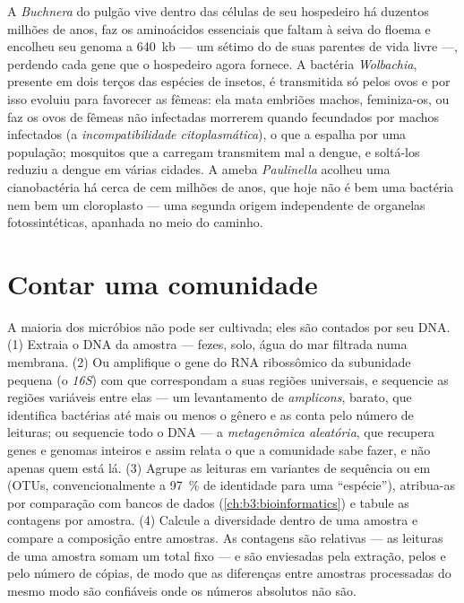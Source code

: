\begin{example}\label{ex:b3:microbiomes:obligate}
A \emph{Buchnera} do pulgão vive dentro das células de seu hospedeiro
há duzentos milhões de anos, faz os aminoácidos essenciais que faltam à
seiva do floema e encolheu seu genoma a \qty{640}{kb} --- um sétimo do
de suas parentes de vida livre ---, perdendo cada gene que o hospedeiro
agora fornece. A bactéria \emph{Wolbachia}, presente em dois terços das
espécies de insetos, é transmitida só pelos ovos e por isso evoluiu
para favorecer as fêmeas: ela mata embriões machos, feminiza-os, ou faz
os ovos de fêmeas não infectadas morrerem quando fecundados por machos
infectados (a \emph{incompatibilidade citoplasmática}), o que a espalha
por uma população; mosquitos que a carregam transmitem mal a dengue, e
soltá-los reduziu a dengue em várias cidades. A ameba
\emph{Paulinella} acolheu uma cianobactéria há cerca de cem milhões de
anos, que hoje não é bem uma bactéria nem bem um cloroplasto --- uma
segunda origem independente de organelas fotossintéticas, apanhada no
meio do caminho.
\end{example}

\section{Contar uma comunidade}

\begin{method}\label{met:b3:microbiomes:16s}
A maioria dos micróbios não pode ser cultivada; eles são contados por
seu DNA. (1) Extraia o DNA da amostra --- fezes, solo, água do mar
filtrada numa membrana. (2) Ou amplifique o gene do RNA ribossômico da
subunidade pequena (o \emph{16S}) com  que correspondam a
suas regiões universais, e sequencie as regiões variáveis entre elas
--- um levantamento de \emph{amplicons}, barato, que identifica
bactérias até mais ou menos o gênero e as conta pelo número de leituras;
ou sequencie todo o DNA --- a \emph{metagenômica aleatória}, que
recupera genes e genomas inteiros e assim relata o que a comunidade
sabe fazer, e não apenas quem está lá. (3) Agrupe as leituras em
variantes de sequência ou em \emph{}
(OTUs, convencionalmente a \qty{97}{\%} de identidade para uma
``espécie''), atribua-as por comparação com bancos de dados
(\cref{ch:b3:bioinformatics}) e tabule as contagens por amostra. (4)
Calcule a diversidade dentro de uma amostra e compare a composição
entre amostras. As contagens são relativas --- as leituras de uma
amostra somam um total fixo --- e são enviesadas pela extração, pelos
 e pelo número de cópias, de modo que as diferenças entre
amostras processadas do mesmo modo são confiáveis onde os números
absolutos não são.
\end{method}

